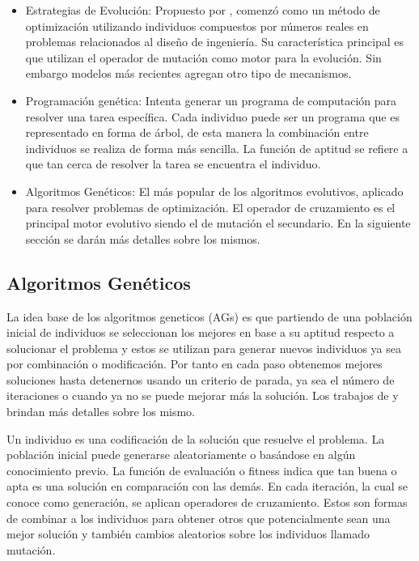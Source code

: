 \begin{itemize}

	\item Estrategias de Evolución: Propuesto por \citet{Ingo1971}, comenzó como un método de optimización utilizando individuos compuestos por números reales en problemas relacionados al diseño de ingeniería. Su característica principal es que utilizan el operador de mutación como motor para la evolución. Sin embargo modelos más recientes agregan otro tipo de mecanismos.
	\item Programación genética: Intenta generar un programa de computación para resolver una tarea específica. Cada individuo puede ser un programa que es representado en forma de árbol, de esta manera la combinación entre individuos se realiza de forma más sencilla. La función de aptitud se refiere a que tan cerca de resolver la tarea se encuentra el individuo.\citep{Koza1992}
	\item Algoritmos Genéticos: El más popular de los algoritmos evolutivos, aplicado para resolver problemas de optimización. El operador de cruzamiento es el principal motor evolutivo siendo el de mutación el secundario. En la siguiente sección se darán más detalles sobre los mismos.
\end{itemize}

\subsection{Algoritmos Genéticos}
La idea base de los algoritmos geneticos (AGs) es que partiendo de una población inicial de individuos se seleccionan los mejores en base a su aptitud respecto a solucionar el problema y estos se utilizan para generar nuevos individuos ya sea por combinación o modificación. Por tanto en cada paso obtenemos mejores soluciones hasta detenernos usando un criterio de parada, ya sea el número de iteraciones o cuando ya no se puede mejorar más la solución. Los trabajos de \citet{Goldberg1989} y \citet{Mitchell1996} brindan más detalles sobre los mismo.

Un individuo es una codificación de la solución que resuelve el problema. La población inicial puede generarse aleatoriamente o basándose en algún conocimiento previo. La función de evaluación o fitness indica que tan buena o apta es una solución en comparación con las demás.
En cada iteración, la cual se conoce como generación, se aplican operadores de cruzamiento. Estos son formas de combinar a los individuos para obtener otros que potencialmente sean una mejor solución y también cambios aleatorios sobre los individuos llamado mutación.


